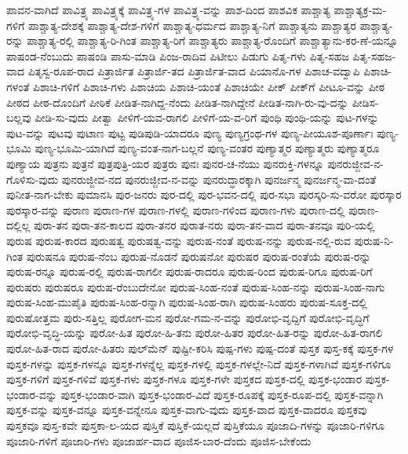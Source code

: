 {ಪಾವನ-ವಾಗಿದೆ
ಪಾವಿತ್ರ್ಯ
ಪಾವಿತ್ರ್ಯಕ್ಕೆ
ಪಾವಿತ್ರ್ಯ-ಗಳ
ಪಾವಿತ್ರ್ಯ-ವನ್ನು
ಪಾಶ-ದಿಂದ
ಪಾಶವಿಕ
ಪಾಶ್ಚಾತ್ಯ
ಪಾಶ್ಚಾತ್ಯಕ್ರ-ಮ-ಗಳಿಗೆ
ಪಾಶ್ಚಾತ್ಯ-ದೇಶಕ್ಕೆ
ಪಾಶ್ಚಾತ್ಯ-ದೇಶ-ಗಳಿಗೆ
ಪಾಶ್ಚಾತ್ಯ-ಧರ್ಮದ
ಪಾಶ್ಚಾತ್ಯ-ನಿಗೆ
ಪಾಶ್ಚಾತ್ಯನು
ಪಾಶ್ಚಾತ್ಯರ
ಪಾಶ್ಚಾತ್ಯ-ರನ್ನು
ಪಾಶ್ಚಾತ್ಯ-ರಲ್ಲಿ
ಪಾಶ್ಚಾತ್ಯ-ರಿ-ಗಿಂತ
ಪಾಶ್ಚಾತ್ಯ-ರಿಗೆ
ಪಾಶ್ಚಾತ್ಯರು
ಪಾಶ್ಚಾತ್ಯ-ರೊಂದಿಗೆ
ಪಾಶ್ಚಾತ್ಯಾನು-ಕರ-ಣೆ-ಯನ್ನೂ
ಪಾಷಂಡ-ನೆಂಬುದು
ಪಾಷಂಡಿ
ಪಾಸು-ಮಾಡಿ
ಪಿಂಜ-ರಾದಿವ
ಪಿಟೀಲು
ಪಿಡುಗು
ಪಿತೃ-ಗಳು
ಪಿತೃ-ಸಹಜ
ಪಿತೃ-ಸಹಜ-ವಾದ
ಪಿತೃಸ್ವ-ರೂಪ-ರಾದ
ಪಿತ್ರಾರ್ಜಿತ
ಪಿತ್ರಾರ್ಜಿ-ತದ
ಪಿತ್ರಾರ್ಜಿತ-ವಾದ
ಪಿಯಾನೊ-ಗಳ
ಪಿಶಾಚ-ವದ್ವಾಪಿ
ಪಿಶಾಚಿ-ಗಳಂತೆ
ಪಿಶಾಚಿ-ಗಳಿಗೆ
ಪಿಶಾಚಿ-ಗಳು
ಪಿಶಾಚಿಯ
ಪಿಶಾಚಿ-ಯಂತೆ
ಪಿಶಾಚಿಯೇ
ಪೀಕ್
ಪೀಕ್‌ಗೆ
ಪೀಟೂ-ವನ್ನು
ಪೀಠ
ಪೀಠದ
ಪೀಠ-ದೊಂದಿಗೆ
ಪೀಠಿಕೆ
ಪೀಡಿತ-ನಾಗಿದ್ದ-ನೆಂದು
ಪೀಡಿತ-ನಾಗಿದ್ದೇನೆ
ಪೀಡಿತ-ನಾಗಿ-ರು-ವು-ದನ್ನು
ಪೀಡಿಸ-ಬಲ್ಲವು
ಪೀಡಿ-ಸು-ವುದು
ಪೀತ್ವಾ
ಪೀಳಿಗೆ-ಯವ-ರಾಗಲಿ
ಪೀಳಿಗೆ-ಯ-ವ-ರಿಗೆ
ಪುಂಥಿ
ಪುಂಥಿ-ಯನ್ನು
ಪುಟ-ಗಳನ್ನು
ಪುಟ-ವನ್ನು
ಪುಟವು
ಪುಟಾಣ
ಪುಟ್ಟ
ಪುಡಿಪುಡಿ-ಯಾದರೂ
ಪುಣ್ಯ
ಪುಣ್ಯಗ್ರಂಥ-ಗಳ
ಪುಣ್ಯ-ಪೀಯೂಶ-ಪೂರ್ಣಾಃ
ಪುಣ್ಯ-ಭೂಮಿ
ಪುಣ್ಯ-ಭೂಮಿ-ಯಾಗಿದೆ
ಪುಣ್ಯ-ವಂತ-ನಾಗ-ಬಲ್ಲನೆ
ಪುಣ್ಯ-ವಂತರ
ಪುಣ್ಯಾತ್ಮರ
ಪುಣ್ಯಾತ್ಮರು
ಪುಣ್ಯಾತ್ಮರೂ
ಪುಣ್ಯಾಯ
ಪುತ್ರನು
ಪುತ್ರನೆ
ಪುತ್ರಪುತ್ರಿ-ಯರ
ಪುತ್ರರು
ಪುನಃ
ಪುನರ-ಚ-ನೆಯು
ಪುನರುಕ್ತಿ-ಗಳನ್ನೂ
ಪುನರುಜ್ಜೀವ-ನ-ಗೊಳಿಸು-ವುದು
ಪುನರುಜ್ಜೀವ-ನದ
ಪುನರುಜ್ಜೀವ-ನ-ವನ್ನು
ಪುನರುದ್ಧಾರಕ್ಕಾಗಿ
ಪುನರ್ಜನ್ಮ
ಪುನರ್ಜನ್ಮ-ವಾ-ದಂತೆ
ಪುನೀತ-ನಾಗ-ಬೇಕು
ಪುಮಾನಸಿ
ಪುರ-ಜನರು
ಪುರ-ದಲ್ಲಿ
ಪುರ-ಭವನ-ದಲ್ಲಿ
ಪುರ-ಸಭಾ
ಪುರಸ್ಕರಿ-ಸು-ವರೋ
ಪುರಸ್ಕಾರ
ಪುರಸ್ಕಾರ-ವನ್ನು
ಪುರಾಣ
ಪುರಾಣ-ಗಳ
ಪುರಾಣ-ಗಳಲ್ಲಿ
ಪುರಾಣ-ಗಳಿಂದ
ಪುರಾಣ-ಗಳು
ಪುರಾಣ-ದಲ್ಲಿ
ಪುರಾಣ-ದಲ್ಲಿಲ್ಲ
ಪುರಾ-ತನ
ಪುರಾ-ತನ-ಕಾಲದ
ಪುರಾ-ತನರ
ಪುರಾತ-ನರು
ಪುರಾ-ತನ-ವಾದ
ಪುರಾ-ತನವೂ
ಪುರಿ-ಯಲ್ಲಿ
ಪುರುಷ
ಪುರುಷ-ಕಾರದ
ಪುರುಷತ್ವ
ಪುರುಷತ್ವ-ವನ್ನು
ಪುರುಷ-ನಂತೆ
ಪುರುಷ-ನನ್ನು
ಪುರುಷ-ನಲ್ಲಿ-ರುವ
ಪುರುಷ-ನಿ-ಗಿಂತ
ಪುರುಷನೂ
ಪುರುಷ-ನೆಂಬ
ಪುರುಷ-ನೊಡನೆ
ಪುರುಷನೋ
ಪುರುಷರ
ಪುರುಷ-ರಂತೆಯೆ
ಪುರುಷ-ರನ್ನು
ಪುರುಷ-ರನ್ನೂ
ಪುರುಷ-ರಲ್ಲಿ
ಪುರುಷ-ರಾಗಲೀ
ಪುರುಷ-ರಾದರೂ
ಪುರುಷ-ರಿಂದ
ಪುರುಷ-ರಿಗೂ
ಪುರುಷ-ರಿಗೆ
ಪುರುಷರು
ಪುರುಷರೂ
ಪುರುಷ-ರೆಂಬುದೇನೋ
ಪುರುಷ-ಸಿಂಹ-ನಂತೆ
ಪುರುಷ-ಸಿಂಹ-ನನ್ನು
ಪುರುಷ-ಸಿಂಹ-ನಾಗು
ಪುರುಷ-ಸಿಂಹ-ಮುಪೈತಿ
ಪುರುಷ-ಸಿಂಹ-ರನ್ನಾಗಿ
ಪುರುಷ-ಸಿಂಹ-ರಾಗಿ
ಪುರುಷ-ಸಿಂಹರು
ಪುರುಷ-ಸೂಕ್ತ-ದಲ್ಲಿ
ಪುರುಷೋತ್ತಮ
ಪುರು-ಸತ್ತಿಲ್ಲ
ಪುರೋಗ-ಮನ
ಪುರೋ-ಗಮ-ನ-ವನ್ನು
ಪುರೋಭಿ-ವೃದ್ದಿಗೆ
ಪುರೋಭಿ-ವೃದ್ಧಿಗೆ
ಪುರೋಭಿ-ವೃದ್ಧಿ-ಯನ್ನು
ಪುರೋ-ಹಿತ
ಪುರೋ-ಹಿ-ತನು
ಪುರೋ-ಹಿತರ
ಪುರೋ-ಹಿತ-ರನ್ನು
ಪುರೋ-ಹಿತ-ರಾಗಲಿ
ಪುರೋ-ಹಿತ-ರಾದ
ಪುರೋ-ಹಿತರು
ಪುಲ್‌ಮೆನ್
ಪುಷ್ಟೀ-ಕರಿಸಿ
ಪುಷ್ಪ-ಗಳು
ಪುಷ್ಪ-ದಂತೆ
ಪುಸ್ತಕ
ಪುಸ್ತ-ಕಕ್ಕೆ
ಪುಸ್ತಕ-ಗಳ
ಪುಸ್ತಕ-ಗಳನ್ನು
ಪುಸ್ತಕ-ಗಳನ್ನೂ
ಪುಸ್ತಕ-ಗಳನ್ನೆಲ್ಲ
ಪುಸ್ತಕ-ಗಳಲ್ಲಿ
ಪುಸ್ತಕ-ಗಳಲ್ಲೇ-ನಿದೆ
ಪುಸ್ತಕ-ಗಳಾಗಿವೆ
ಪುಸ್ತಕ-ಗಳಿಗೂ
ಪುಸ್ತಕ-ಗಳಿಗೆ
ಪುಸ್ತಕ-ಗಳಿವೆ
ಪುಸ್ತಕ-ಗಳು
ಪುಸ್ತಕ-ಗಳೂ
ಪುಸ್ತಕ-ಗಳೇ
ಪುಸ್ತಕದ
ಪುಸ್ತಕ-ದಲ್ಲಿ
ಪುಸ್ತಕ-ಭಂಡಾರ
ಪುಸ್ತಕ-ಭಂಡಾರ-ವನ್ನು
ಪುಸ್ತಕ-ಭಂಡಾರ-ವಾಗಿ
ಪುಸ್ತಕ-ಭಂಡಾರ-ವಿದೆ
ಪುಸ್ತಕ-ರೂಪಕ್ಕೆ
ಪುಸ್ತಕ-ರೂಪ-ದಲ್ಲಿ
ಪುಸ್ತಕ-ವನ್ನಾಗಿ
ಪುಸ್ತಕ-ವನ್ನು
ಪುಸ್ತಕ-ವನ್ನೂ
ಪುಸ್ತಕ-ವನ್ನೇನೂ
ಪುಸ್ತಕ-ವಾಗು-ವುದು
ಪುಸ್ತಕ-ವಾದ
ಪುಸ್ತಕ-ವಾದರೂ
ಪುಸ್ತಕವು
ಪುಸ್ತಕವೂ
ಪುಸ್ತ-ಕವೇ
ಪುಸ್ತಕಾ-ಲ-ಯದ
ಪುಸ್ತಿಕೆ
ಪುಸ್ತಿಕೆ-ಯಲ್ಲದೆ
ಪುಸ್ತಿಕೆಯೂ
ಪೂಜಾದಿ-ಗಳನ್ನು
ಪೂಜಾರಿ-ಗಳಿಗೂ
ಪೂಜಾರಿ-ಗಳಿಗೆ
ಪೂಜಾರಿ-ಗಳು
ಪೂಜಾರ್ಹ-ವಾದ
ಪೂಜಿಸ-ಬಾರ-ದೆಂದು
ಪೂಜಿಸ-ಬೇಕೆಂದು
}
